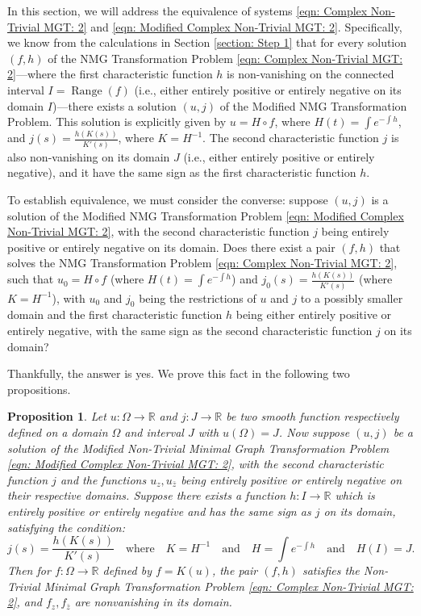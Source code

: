 \documentclass[12pt]{article}
\theoremstyle{plain}
\newtheorem{proposition}[theorem]{Proposition}
\theoremstyle{definition}
\theoremstyle{remark}
\begin{document}
In this section, we will address the equivalence of systems \ref{eqn: Complex Non-Trivial MGT: 2} and \ref{eqn: Modified Complex Non-Trivial MGT: 2}. Specifically, we know from the calculations in Section \ref{section: Step 1} that for every solution \((f,h)\) of the NMG Transformation Problem \ref{eqn: Complex Non-Trivial MGT: 2}—where the first characteristic function \(h\) is non-vanishing on the connected interval \(I = \operatorname{Range}(f)\) (i.e., either entirely positive or entirely negative on its domain \(I\))—there exists a solution \((u,j)\) of the Modified NMG Transformation Problem. This solution is explicitly given by \(u = H \circ f\), where \(H(t) = \int e^{-\int h}\), and \(j(s) = \frac{h(K(s))}{K'(s)}\), where \(K = H^{-1}\). The second characteristic function \(j\) is also non-vanishing on its domain \(J\) (i.e., either entirely positive or entirely negative), and it have the same sign as the first characteristic function \(h\).

To establish equivalence, we must consider the converse: suppose \((u,j)\) is a solution of the Modified NMG Transformation Problem \ref{eqn: Modified Complex Non-Trivial MGT: 2}, with the second characteristic function \(j\) being entirely positive or entirely negative on its domain. Does there exist a pair \((f,h)\) that solves the NMG Transformation Problem \ref{eqn: Complex Non-Trivial MGT: 2}, such that \(u_0 = H \circ f\) (where \(H(t) = \int e^{-\int h}\)) and \(j_0(s) = \frac{h(K(s))}{K'(s)}\) (where \(K = H^{-1}\)), with \(u_0\) and \(j_0\) being the restrictions of \(u\) and \(j\) to a possibly smaller domain and the first characteristic function \(h\) being either entirely positive or entirely negative, with the same sign as the second characteristic function \(j\) on its domain?

Thankfully, the answer is yes. We prove this fact in the following two propositions.
  
\begin{proposition}
	Let \(u:\Omega\longrightarrow\mathbb{R}\) and \(j:J\longrightarrow\mathbb{R}\) be two smooth function respectively defined on a domain \(\Omega\) and interval \(J\) with \(u(\Omega)=J\). Now suppose  \((u,j)\) be a solution of the Modified Non-Trivial Minimal Graph Transformation Problem \ref{eqn: Modified Complex Non-Trivial MGT: 2}, with the second characteristic function \(j\) and the functions \(u_z, u_{\bar z}\) being entirely positive or entirely negative on their respective domains. Suppose there exists a function \(h: I\longrightarrow\mathbb{R}\) which is entirely positive or entirely negative and has the same sign as \(j\) on its domain, satisfying the condition:
	\[
	j(s) = \frac{h(K(s))}{K'(s)} \quad \text{where} \quad K = H^{-1} \quad \text{and} \quad H = \int e^{-\int h} \quad \text{and} \quad H(I)=J.
	\]
	Then for \(f:\Omega\longrightarrow\mathbb{R}\) defined by \(f = K(u)\), the pair \((f,h)\) satisfies the Non-Trivial Minimal Graph Transformation Problem \ref{eqn: Complex Non-Trivial MGT: 2}, and \(f_z,f_{\bar z}\) are nonvanishing in its domain.
\end{proposition}
\end{document}
